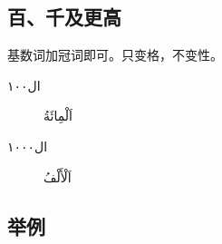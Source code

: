 
\subsection{百、千及更高}

基数词加冠词即可。只变格，不变性。

\begin{Arabic}
    \begin{multicols}{2}
        \begin{description}
            \item[ال١٠٠] اَلْمِائَةُ 
            \item[ال١٠٠٠] اَلْأَلْفُ
        \end{description}
    \end{multicols}
\end{Arabic}

\subsection{举例}


